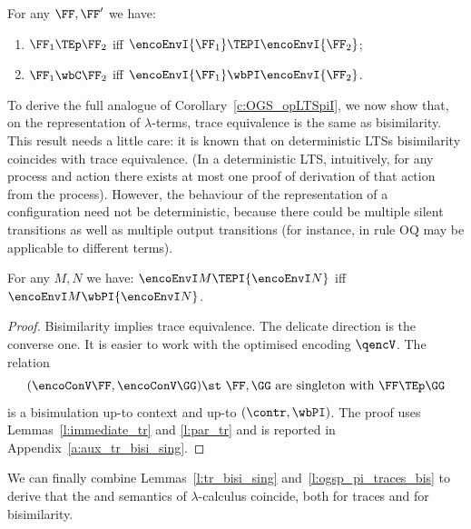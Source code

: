 \begin{lemma} %
\label{l:ogsp_pi_traces_bis}
For any $\FF,\FF'$ we have:
\begin{enumerate}
\item
 $\FF_1 \TEp \FF_2$ iff 
 $\encoEnvI {\FF_1} \TEPI \encoEnvI {\FF_2}$;  
\item
 $\FF_1 \wbC \FF_2$ iff 
 $\encoEnvI {\FF_1} \wbPI  \encoEnvI {\FF_2}$.  
\end{enumerate} 
\end{lemma} 

\noindent
To derive the full analogue of Corollary~\ref{c:OGS_opLTSpiI},  
we now show that, on the \piI representation of $\lambda$-terms,
trace equivalence is the same as bisimilarity.
This result needs a little care:
it is known that on deterministic LTSs
bisimilarity coincides with trace equivalence.
\iflong
  (In a deterministic
 LTS, intuitively,  for any process and action there exists at most
 one proof of derivation of that action from the process).
\fi
However,
 the behaviour of the \piI representation of a  \COGS
 configuration
 need not be
deterministic, because there could be
multiple silent transitions as well as multiple output transitions 
(for instance, in \COGS
rule OQ may be
applicable to different terms).

\iflong
{} 
\fi

\begin{lemma}
\label{l:tr_bisi_sing}
For any $M,N$ we have: $
{\encoEnvI M} \TEPI {\encoEnvI N}
$ iff 
${\encoEnvI M} \wbPI {\encoEnvI N}$.
\end{lemma} 

\begin{proof}
Bisimilarity implies trace equivalence. 
 The delicate direction is the converse one.
It is easier to work with the optimised encoding  $\qencV$.
The relation 
\[ 
(\encoConV \FF,  \encoConV \GG) \st \mbox{ $\FF,\GG$ are singleton with $\FF \TEp
\GG$}
\]
is a bisimulation up-to context and up-to $(\contr,
 \wbPI)$. 
The proof uses
Lemmas~\ref{l:immediate_tr} and \ref{l:par_tr}
and is reported in
Appendix~\ref{a:aux_tr_bisi_sing}.
\end{proof}

\noindent
 We can finally  combine Lemmas~\ref{l:tr_bisi_sing} and~\ref{l:ogsp_pi_traces_bis}  
 to  derive that the \COGS and \piI semantics of $\lambda$-calculus
coincide, both for traces and for bisimilarity. 

